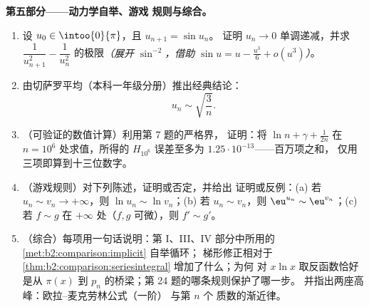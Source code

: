 \begin{problem}
\medskip
\noindent\textbf{第五部分——动力学自举、游戏
规则与综合。}
\begin{enumerate}[resume]
  \item 设 $u_0 \in \intoo{0}{\pi}$，且 $u_{n+1} = \sin u_n$。
        证明 $u_n \to 0$ 单调递减，并求
        $\dfrac{1}{u_{n+1}^2} - \dfrac{1}{u_n^2}$ 的极限\emph{（展开
        $\sin^{-2}$，借助 $\sin u = u - \frac{u^3}6 + o(u^3)$）}。
  \item 由切萨罗平均（本科一年级分册）推出经典结论：
        \[
        u_n \sim \sqrt{\frac{3}{n}} .
        \]
  \item （可验证的数值计算）利用第 7 题的严格界，
        证明：将 $\ln n + \gamma + \frac1{2n}$ 在 $n
        = 10^6$ 处求值，所得的 $H_{10^6}$ 误差至多为
        $1.25\cdot10^{-13}$——百万项之和，
        仅用三项即算到十三位数字。
  \item （游戏规则）对下列陈述，证明或否定，并给出
        证明或反例：(a) 若 $u_n \sim v_n \to +\infty$，则
        $\ln u_n \sim \ln v_n$；(b) 若 $u_n \sim v_n$，则
        $\eu^{u_n} \sim \eu^{v_n}$；(c) 若 $f \sim g$ 在
        $+\infty$ 处（$f, g$ 可微），则 $f' \sim g'$。
  \item （综合）每项用一句话说明：第 I、III、IV 部分中所用的
        \cref{met:b2:comparison:implicit} 自举循环；
        梯形修正相对于
        \cref{thm:b2:comparison:seriesintegral} 增加了什么；为何
        对 $x\ln x$ 取反函数恰好是从 $\pi(x)$ 到
        $p_n$ 的桥梁；第 24 题的哪条规则保护了哪一步。
        并指出两座高峰：欧拉–麦克劳林公式（一阶）
        与第 $n$ 个
        质数的渐近律。
\end{enumerate}
\end{problem}
